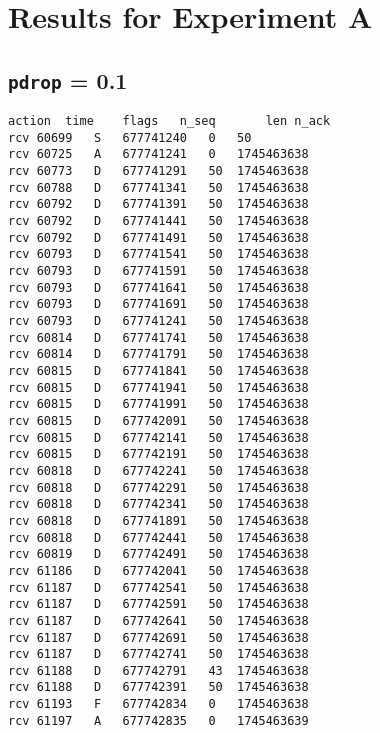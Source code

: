 \documentclass[a4paper]{article}
\begin{document}
\appendix

\section{Results for Experiment A} \label{expa}

\subsection {\texttt{pdrop} = 0.1}
\begin{lstlisting}
action	time	flags	n_seq		len	n_ack
rcv	60699	S	677741240	0	50
rcv	60725	A	677741241	0	1745463638
rcv	60773	D	677741291	50	1745463638
rcv	60788	D	677741341	50	1745463638
rcv	60792	D	677741391	50	1745463638
rcv	60792	D	677741441	50	1745463638
rcv	60792	D	677741491	50	1745463638
rcv	60793	D	677741541	50	1745463638
rcv	60793	D	677741591	50	1745463638
rcv	60793	D	677741641	50	1745463638
rcv	60793	D	677741691	50	1745463638
rcv	60793	D	677741241	50	1745463638
rcv	60814	D	677741741	50	1745463638
rcv	60814	D	677741791	50	1745463638
rcv	60815	D	677741841	50	1745463638
rcv	60815	D	677741941	50	1745463638
rcv	60815	D	677741991	50	1745463638
rcv	60815	D	677742091	50	1745463638
rcv	60815	D	677742141	50	1745463638
rcv	60815	D	677742191	50	1745463638
rcv	60818	D	677742241	50	1745463638
rcv	60818	D	677742291	50	1745463638
rcv	60818	D	677742341	50	1745463638
rcv	60818	D	677741891	50	1745463638
rcv	60818	D	677742441	50	1745463638
rcv	60819	D	677742491	50	1745463638
rcv	61186	D	677742041	50	1745463638
rcv	61187	D	677742541	50	1745463638
rcv	61187	D	677742591	50	1745463638
rcv	61187	D	677742641	50	1745463638
rcv	61187	D	677742691	50	1745463638
rcv	61187	D	677742741	50	1745463638
rcv	61188	D	677742791	43	1745463638
rcv	61188	D	677742391	50	1745463638
rcv	61193	F	677742834	0	1745463638
rcv	61197	A	677742835	0	1745463639
\end{lstlisting}
\end{document}
